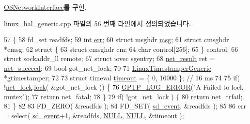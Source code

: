 \hyperlink{class_o_s_network_interface_a180931fa9d850cc342bc0ecd7b04e12a}{O\+S\+Network\+Interface}를 구현.



linux\+\_\+hal\+\_\+generic.\+cpp 파일의 56 번째 라인에서 정의되었습니다.


\begin{DoxyCode}
57 \{
58     fd\_set readfds;
59     \textcolor{keywordtype}{int} \hyperlink{gst__avb__playbin_8c_a6ce68847c12434f60d1b2654a3dc3409}{err};
60     \textcolor{keyword}{struct }msghdr \hyperlink{maap__log__linux_8c_a0c7e58a50354c4a4d6dad428d0e47029}{msg};
61     \textcolor{keyword}{struct }cmsghdr *cmsg;
62     \textcolor{keyword}{struct }\{
63         \textcolor{keyword}{struct }cmsghdr cm;
64         \textcolor{keywordtype}{char} control[256];
65     \} control;
66     \textcolor{keyword}{struct }sockaddr\_ll remote;
67     \textcolor{keyword}{struct }iovec sgentry;
68     \hyperlink{avbts__osnet_8hpp_a21b2b4b5e479ef3adfc039ac30c961cd}{net\_result} ret = \hyperlink{avbts__osnet_8hpp_a21b2b4b5e479ef3adfc039ac30c961cda349eff10b7ad8aef2477575f9306e579}{net\_succeed};
69     \textcolor{keywordtype}{bool} got\_net\_lock;
70 
71     \hyperlink{class_linux_timestamper_generic}{LinuxTimestamperGeneric} *gtimestamper;
72 
73     \textcolor{keyword}{struct }timeval \hyperlink{aaf-listener_8c_a869c60cb165af7b6177060c00c5c416c}{timeout} = \{ 0, 16000 \}; \textcolor{comment}{// 16 ms}
74 
75     \textcolor{keywordflow}{if}( !\hyperlink{class_linux_network_interface_a2485d8ad81138164119a9e8b68642a1d}{net\_lock}.\hyperlink{class_ticketing_lock_a27addfbd7031de7dc72d73e9e89449bd}{lock}( &got\_net\_lock )) \{
76         \hyperlink{gptp__log_8hpp_afefbb1009717c128012bfeed94842987}{GPTP\_LOG\_ERROR}(\textcolor{stringliteral}{"A Failed to lock mutex"});
77         \textcolor{keywordflow}{return} \hyperlink{avbts__osnet_8hpp_a21b2b4b5e479ef3adfc039ac30c961cda2ab09e0547baba0a6c07a8d53e1529a5}{net\_fatal};
78     \}
79     \textcolor{keywordflow}{if}( !got\_net\_lock ) \{
80         \textcolor{keywordflow}{return} \hyperlink{avbts__osnet_8hpp_a21b2b4b5e479ef3adfc039ac30c961cda02bf20698d895d3c6a6db8926645d69b}{net\_trfail};
81     \}
82 
83     FD\_ZERO( &readfds );
84     FD\_SET( \hyperlink{class_linux_network_interface_ab2e41169dafb40e1ab917422a2d1145a}{sd\_event}, &readfds );
85 
86     err = select( \hyperlink{class_linux_network_interface_ab2e41169dafb40e1ab917422a2d1145a}{sd\_event}+1, &readfds, \hyperlink{openavb__types__base__pub_8h_a070d2ce7b6bb7e5c05602aa8c308d0c4}{NULL}, \hyperlink{openavb__types__base__pub_8h_a070d2ce7b6bb7e5c05602aa8c308d0c4}{NULL}, &timeout );

\end{DoxyCode}
